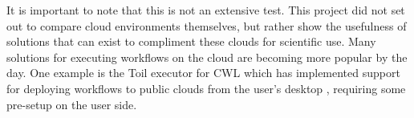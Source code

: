 It is important to note that this is not an extensive test. This project did not set out to compare cloud environments themselves, but rather show the usefulness of solutions that can exist to compliment these clouds for scientific use. Many solutions for executing workflows on the cloud are becoming more popular by the day. One example is the Toil executor for CWL which has implemented support for deploying workflows to public clouds from the user's desktop \parencite{vivian2017toil}, requiring some pre-setup on the user side.
